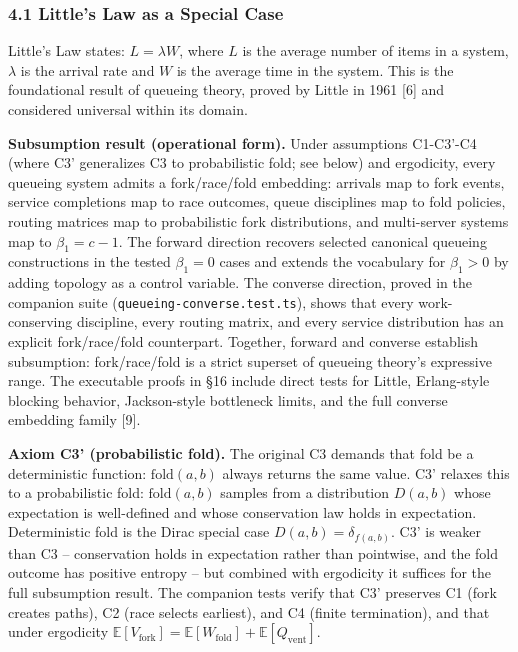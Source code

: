 \documentclass[
  11pt,
]{article}
\begin{document}
\subsubsection{4.1 Little's Law as a Special
Case}\label{littles-law-as-a-special-case}

Little's Law states: \(L = \lambda W\), where \(L\) is the average
number of items in a system, \(\lambda\) is the arrival rate and \(W\)
is the average time in the system. This is the foundational result of
queueing theory, proved by Little in 1961 {[}6{]} and considered
universal within its domain.

\textbf{Subsumption result (operational form).} Under assumptions
C1-C3'-C4 (where C3' generalizes C3 to probabilistic fold; see below)
and ergodicity, every queueing system admits a fork/race/fold embedding:
arrivals map to fork events, service completions map to race outcomes,
queue disciplines map to fold policies, routing matrices map to
probabilistic fork distributions, and multi-server systems map to
\(\beta_1 = c - 1\). The forward direction recovers selected canonical
queueing constructions in the tested \(\beta_1 = 0\) cases and extends
the vocabulary for \(\beta_1 > 0\) by adding topology as a control
variable. The converse direction, proved in the companion suite
(\texttt{queueing-converse.test.ts}), shows that every work-conserving
discipline, every routing matrix, and every service distribution has an
explicit fork/race/fold counterpart. Together, forward and converse
establish subsumption: fork/race/fold is a strict superset of queueing
theory's expressive range. The executable proofs in §16 include direct
tests for Little, Erlang-style blocking behavior, Jackson-style
bottleneck limits, and the full converse embedding family {[}9{]}.

\textbf{Axiom C3' (probabilistic fold).} The original C3 demands that
fold be a deterministic function: \(\text{fold}(a, b)\) always returns
the same value. C3' relaxes this to a probabilistic fold:
\(\text{fold}(a, b)\) samples from a distribution \(D(a, b)\) whose
expectation is well-defined and whose conservation law holds in
expectation. Deterministic fold is the Dirac special case
\(D(a, b) = \delta_{f(a,b)}\). C3' is weaker than C3 -- conservation
holds in expectation rather than pointwise, and the fold outcome has
positive entropy -- but combined with ergodicity it suffices for the
full subsumption result. The companion tests verify that C3' preserves
C1 (fork creates paths), C2 (race selects earliest), and C4 (finite
termination), and that under ergodicity
\(\mathbb{E}[V_{\text{fork}}] = \mathbb{E}[W_{\text{fold}}] + \mathbb{E}[Q_{\text{vent}}]\).
\end{document}
